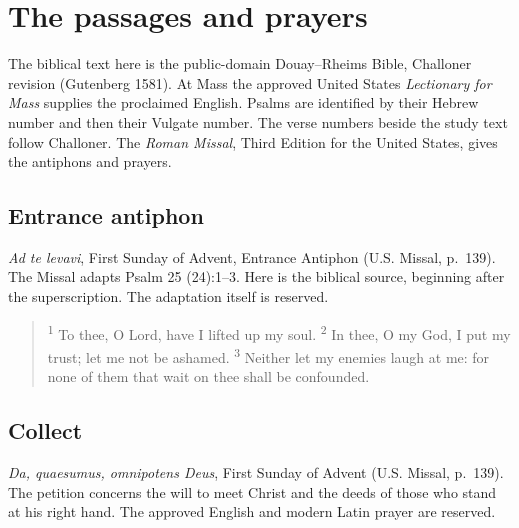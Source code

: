\section{The passages and prayers}

The biblical text here is the public-domain Douay--Rheims Bible, Challoner revision (Gutenberg 1581). At Mass the approved United States \textit{Lectionary for Mass} supplies the proclaimed English. Psalms are identified by their Hebrew number and then their Vulgate number. The verse numbers beside the study text follow Challoner. The \textit{Roman Missal}, Third Edition for the United States, gives the antiphons and prayers.

\subsection{Entrance antiphon}
\label{proper-entrance}
\textit{Ad te levavi}, First Sunday of Advent, Entrance Antiphon (U.S. Missal, p.~139). The Missal adapts Psalm 25 (24):1--3. Here is the biblical source, beginning after the superscription. The adaptation itself is reserved.
\begin{quote}
\textsuperscript{1} To thee, O Lord, have I lifted up my soul.
\textsuperscript{2} In thee, O my God, I put my trust; let me not be ashamed.
\textsuperscript{3} Neither let my enemies laugh at me: for none of them that wait on thee shall be confounded.
\end{quote}

\subsection{Collect}
\label{proper-collect}
\textit{Da, quaesumus, omnipotens Deus}, First Sunday of Advent (U.S. Missal, p.~139). The petition concerns the will to meet Christ and the deeds of those who stand at his right hand. The approved English and modern Latin prayer are reserved.

